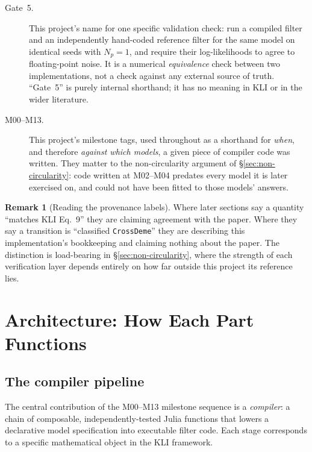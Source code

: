 \documentclass[11pt,leqno]{article}
\newcommand{\code}[1]{\texttt{#1}}
\theoremstyle{plain}
\theoremstyle{definition}
\newtheorem{remark}[theorem]{Remark}
\begin{document}
\begin{description}
\item[Gate~5.]  This project's name for one specific validation check: run a
  compiled filter and an independently hand-coded reference filter for the
  same model on identical seeds with $N_p = 1$, and require their
  log-likelihoods to agree to floating-point noise.  It is a numerical
  \emph{equivalence} check between two implementations, not a check against
  any external source of truth.  ``Gate~5'' is purely internal shorthand;
  it has no meaning in KLI or in the wider literature.

\item[M00--M13.]  This project's milestone tags, used throughout as a
  shorthand for \emph{when}, and therefore \emph{against which models}, a
  given piece of compiler code was written.  They matter to the
  non-circularity argument of \S\ref{sec:non-circularity}: code written at
  M02--M04 predates every model it is later exercised on, and could not
  have been fitted to those models' answers.

\end{description}

\begin{remark}[Reading the provenance labels]
Where later sections say a quantity ``matches KLI Eq.~9'' they are claiming
agreement with the paper.  Where they say a transition is ``classified
\code{CrossDeme}'' they are describing this implementation's bookkeeping and
claiming nothing about the paper.  The distinction is load-bearing in
\S\ref{sec:non-circularity}, where the strength of each verification layer
depends entirely on how far outside this project its reference lies.
\end{remark}


\section{Architecture: How Each Part Functions}
\label{sec:architecture}

\subsection{The compiler pipeline}

The central contribution of the M00--M13 milestone sequence is a
\emph{compiler}: a chain of composable, independently-tested Julia functions
that lowers a declarative model specification into executable filter code.
Each stage corresponds to a specific mathematical object in the KLI framework.
\end{document}
